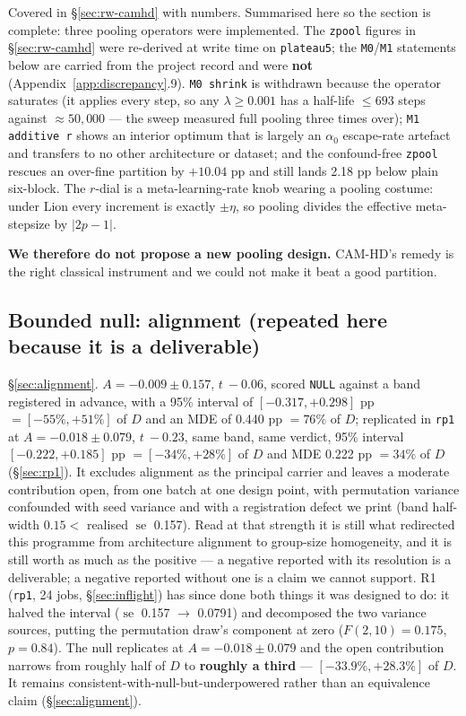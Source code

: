\documentclass[10pt,letterpaper]{article}
\newcommand{\Dstat}{D}                         %
\newcommand{\Astat}{A}                         %
\newcommand{\plateau}{\texttt{plateau5}}
\newcommand{\arm}[1]{\texttt{#1}}
\DeclareMathOperator{\se}{se}
\begin{document}
Covered in \S\ref{sec:rw-camhd} with numbers. Summarised here so the section is complete: three
pooling operators were implemented. The \arm{zpool} figures in \S\ref{sec:rw-camhd} were
re-derived at write time on \plateau; the \texttt{M0}/\texttt{M1} statements below are carried
from the project record and were \textbf{not} (Appendix~\ref{app:discrepancy}.9).
\texttt{M0 shrink} is withdrawn because the operator saturates (it applies every step, so any
$\lambda \ge 0.001$ has a half-life $\le 693$ steps against $\approx 50{,}000$ --- the sweep
measured full pooling three times over); \texttt{M1 additive r} shows an interior optimum that is
largely an $\alpha_0$ escape-rate artefact and transfers to no other architecture or dataset; and
the confound-free \arm{zpool} rescues an over-fine partition by $+10.04$ pp and still lands
2.18 pp below plain six-block. The $r$-dial is a meta-learning-rate knob wearing a pooling costume:
under Lion every increment is exactly $\pm\eta$, so pooling divides the effective meta-stepsize by
$|2p - 1|$.

\textbf{We therefore do not propose a new pooling design.} CAM-HD's remedy is the right classical
instrument and we could not make it beat a good partition.

\subsection{Bounded null: alignment (repeated here because it is a deliverable)}
\label{sec:null-repeat}

\S\ref{sec:alignment}. $\Astat = -0.009 \pm 0.157$, $t\ -0.06$, scored \texttt{NULL} against a band
registered in advance, with a 95\% interval of $[-0.317, +0.298]$ pp $= [-55\%, +51\%]$ of
$\Dstat$ and an MDE of 0.440 pp $= 76\%$ of $\Dstat$; replicated in \arm{rp1} at
$\Astat = -0.018 \pm 0.079$, $t\ -0.23$, same band, same verdict, 95\% interval
$[-0.222, +0.185]$ pp $= [-34\%, +28\%]$ of $\Dstat$ and MDE 0.222 pp $= 34\%$ of $\Dstat$
(\S\ref{sec:rp1}). It excludes alignment as the principal
carrier and leaves a moderate contribution open, from one batch at one design point, with
permutation variance confounded with seed variance and with a registration defect we print (band
half-width $0.15 <$ realised $\se$ 0.157). Read at that strength it is still what redirected this
programme from architecture alignment to group-size homogeneity, and it is still worth as much as
the positive --- a negative reported with its resolution is a deliverable; a negative reported
without one is a claim we cannot support. R1 (\arm{rp1}, 24 jobs, \S\ref{sec:inflight}) has since
done both things it was designed to do: it halved the interval ($\se$ 0.157 $\to$ 0.0791) and
decomposed the two variance sources, putting the permutation draw's component at zero
($F(2,10) = 0.175$, $p = 0.84$). The null replicates at $\Astat = -0.018 \pm 0.079$ and the open
contribution narrows from roughly half of $\Dstat$ to \textbf{roughly a third} ---
$[-33.9\%, +28.3\%]$ of $\Dstat$. It remains consistent-with-null-but-underpowered rather than an
equivalence claim (\S\ref{sec:alignment}).
\end{document}
